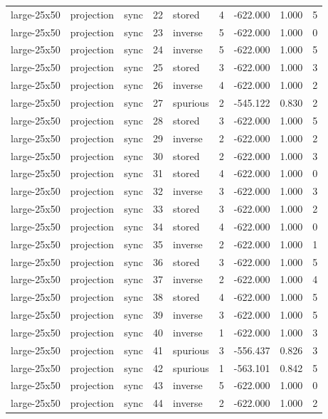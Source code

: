 \begin{tabular}{lllrlrrrr}
large-25x50 & projection & sync & 22 & stored & 4 & -622.000 & 1.000 & 5 \\
large-25x50 & projection & sync & 23 & inverse & 5 & -622.000 & 1.000 & 0 \\
large-25x50 & projection & sync & 24 & inverse & 5 & -622.000 & 1.000 & 5 \\
large-25x50 & projection & sync & 25 & stored & 3 & -622.000 & 1.000 & 3 \\
large-25x50 & projection & sync & 26 & inverse & 4 & -622.000 & 1.000 & 2 \\
large-25x50 & projection & sync & 27 & spurious & 2 & -545.122 & 0.830 & 2 \\
large-25x50 & projection & sync & 28 & stored & 3 & -622.000 & 1.000 & 5 \\
large-25x50 & projection & sync & 29 & inverse & 2 & -622.000 & 1.000 & 2 \\
large-25x50 & projection & sync & 30 & stored & 2 & -622.000 & 1.000 & 3 \\
large-25x50 & projection & sync & 31 & stored & 4 & -622.000 & 1.000 & 0 \\
large-25x50 & projection & sync & 32 & inverse & 3 & -622.000 & 1.000 & 3 \\
large-25x50 & projection & sync & 33 & stored & 3 & -622.000 & 1.000 & 2 \\
large-25x50 & projection & sync & 34 & stored & 4 & -622.000 & 1.000 & 0 \\
large-25x50 & projection & sync & 35 & inverse & 2 & -622.000 & 1.000 & 1 \\
large-25x50 & projection & sync & 36 & stored & 3 & -622.000 & 1.000 & 5 \\
large-25x50 & projection & sync & 37 & inverse & 2 & -622.000 & 1.000 & 4 \\
large-25x50 & projection & sync & 38 & stored & 4 & -622.000 & 1.000 & 5 \\
large-25x50 & projection & sync & 39 & inverse & 3 & -622.000 & 1.000 & 5 \\
large-25x50 & projection & sync & 40 & inverse & 1 & -622.000 & 1.000 & 3 \\
large-25x50 & projection & sync & 41 & spurious & 3 & -556.437 & 0.826 & 3 \\
large-25x50 & projection & sync & 42 & spurious & 1 & -563.101 & 0.842 & 5 \\
large-25x50 & projection & sync & 43 & inverse & 5 & -622.000 & 1.000 & 0 \\
large-25x50 & projection & sync & 44 & inverse & 2 & -622.000 & 1.000 & 2 \\

\end{tabular}
